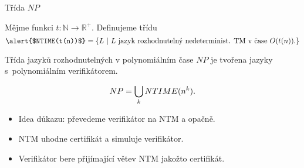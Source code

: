     
    \begin{frame}{Třída $NP$}
    
    
    \begin{definition}[$NP$]
    Mějme funkci $t: \mathbb{N}\to \mathbb{R}^+$. Definujeme třídu
    $$\hbox{\alert{$NTIME(t(n))$}}=
    \{ L\ | \ L \hbox{ jazyk rozhodnutelný nedeterminist. TM v čase $O(t(n))$.}\}
    $$
    \end{definition}
    
    \pause
    \begin{definition*}
    \alert{Třída jazyků rozhodnutelných v polynomiálním čase} \alert{$NP$ }  je tvořena jazyky s~polynomiálním verifikátorem.
    \end{definition*}
    \pause
    
    \begin{theorem}
    $$NP=\bigcup_k NTIME(n^k)\hbox{.}$$
    \end{theorem}
    \pause
    \begin{itemize}
        \item Idea důkazu: převedeme verifikátor na NTM a opačně.
        \item NTM uhodne certifikát a simuluje verifikátor.
        \item Verifikátor bere přijímající větev NTM jakožto certifikát.
    \end{itemize}
    \end{frame}
    
